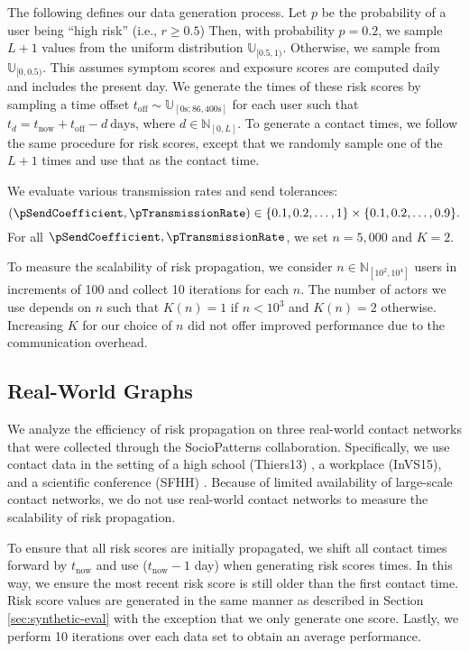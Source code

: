 The following defines our data generation process. Let $p$ be the probability of a user being ``high risk'' (i.e., $r \geq 0.5$) Then, with probability $p = 0.2$, we sample $L + 1$ values from the uniform distribution $\mathbb{U}_{[0.5, 1)}$. Otherwise, we sample from $\mathbb{U}_{[0, 0.5)}$. This assumes symptom scores and exposure scores are computed daily and includes the present day. We generate the times of these risk scores by sampling a time offset $t_{\text{off}} \sim \mathbb{U}_{[0\text{s}; 86,400\text{s}]}$ for each user such that $t_d = t_{\text{now}} + t_{\text{off}} - d~\text{days}$, where $d \in \mathbb{N}_{[0, L]}$. To generate a contact times, we follow the same procedure for risk scores, except that we randomly sample one of the $L + 1$ times and use that as the contact time.

\par We evaluate various transmission rates and send tolerances:
\begin{displaymath}
	(\pSendCoefficient, \pTransmissionRate) \in \{0.1, 0.2, \ldots, 1\} \times \{0.1, 0.2, \ldots, 0.9\}.
\end{displaymath}
For all $\pSendCoefficient, \pTransmissionRate$, we set $n = 5,000$ and $K = 2$.

To measure the scalability of risk propagation, we consider $n \in \mathbb{N}_{[10^2, 10^4]}$ users in increments of 100 and collect 10 iterations for each $n$. The number of actors we use depends on $n$ such that $K(n) = 1$ if $n < 10^3$ and $K(n) = 2$ otherwise. Increasing $K$ for our choice of $n$ did not offer improved performance due to the communication overhead.

\subsection{Real-World Graphs}

We analyze the efficiency of risk propagation on three real-world contact networks that were collected through the SocioPatterns collaboration. Specifically, we use contact data in the setting of a high school (Thiers13) \cite{Fournet2014}, a workplace (InVS15), and a scientific conference (SFHH) \cite{Genois2018}. Because of limited availability of large-scale contact networks, we do not use real-world contact networks to measure the scalability of risk propagation.

To ensure that all risk scores are initially propagated, we shift all contact times forward by $t_{\text{now}}$ and use ($t_{\text{now}} - 1$ day) when generating risk scores times. In this way, we ensure the most recent risk score is still older than the first contact time. Risk score values are generated in the same manner as described in Section \ref{sec:synthetic-eval} with the exception that we only generate one score. Lastly, we perform 10 iterations over each data set to obtain an average performance.

